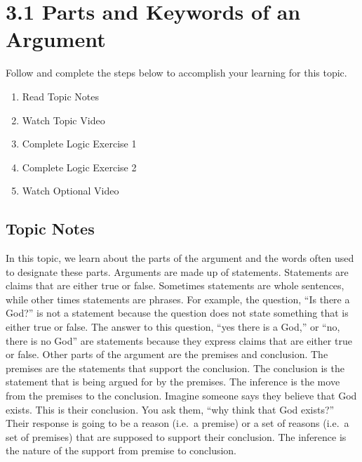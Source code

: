 \documentclass[
]{book}
\providecommand{\tightlist}{%
  \setlength{\itemsep}{0pt}\setlength{\parskip}{0pt}}
\begin{document}
\hypertarget{parts-and-keywords-of-an-argument}{%
\section*{3.1 Parts and Keywords of an Argument}\label{parts-and-keywords-of-an-argument}}

Follow and complete the steps below to accomplish your learning for this topic.

\begin{enumerate}
\def\labelenumi{\arabic{enumi}.}
\tightlist
\item
  Read Topic Notes
\item
  Watch Topic Video
\item
  Complete Logic Exercise 1
\item
  Complete Logic Exercise 2
\item
  Watch Optional Video
\end{enumerate}

\hypertarget{topic-notes-8}{%
\subsection*{Topic Notes}\label{topic-notes-8}}

In this topic, we learn about the parts of the argument and the words often used to designate these parts. Arguments are made up of statements. Statements are claims that are either true or false. Sometimes statements are whole sentences, while other times statements are phrases. For example, the question, ``Is there a God?'' is not a statement because the question does not state something that is either true or false. The answer to this question, ``yes there is a God,'' or ``no, there is no God'' are statements because they express claims that are either true or false. Other parts of the argument are the premises and conclusion. The premises are the statements that support the conclusion. The conclusion is the statement that is being argued for by the premises. The inference is the move from the premises to the conclusion. Imagine someone says they believe that God exists. This is their conclusion. You ask them, ``why think that God exists?'' Their response is going to be a reason (i.e.~a premise) or a set of reasons (i.e.~a set of premises) that are supposed to support their conclusion. The inference is the nature of the support from premise to conclusion.
\end{document}
